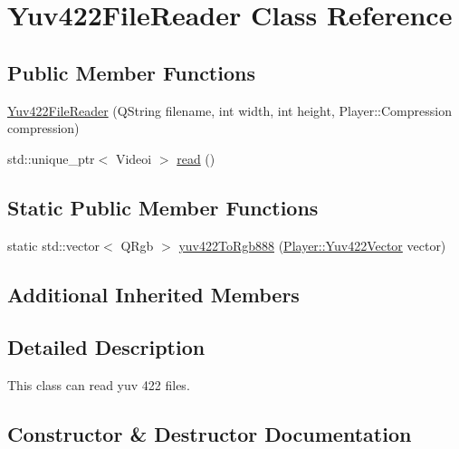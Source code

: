 \hypertarget{classPlayer_1_1Yuv422FileReader}{}\section{Yuv422\+File\+Reader Class Reference}
\label{classPlayer_1_1Yuv422FileReader}
\subsection*{Public Member Functions}
\begin{DoxyCompactItemize}
\item 
\hyperlink{classPlayer_1_1Yuv422FileReader_a877c00dcf796aec81c1cb888ccff26dc}{Yuv422\+File\+Reader} (Q\+String filename, int width, int height, Player\+::\+Compression compression)
\item 
std\+::unique\+\_\+ptr$<$ Videoi $>$ \hyperlink{classPlayer_1_1Yuv422FileReader_a15c2e3c024093026de6ca23b53ba3a22}{read} ()
\end{DoxyCompactItemize}
\subsection*{Static Public Member Functions}
\begin{DoxyCompactItemize}
\item 
static std\+::vector$<$ Q\+Rgb $>$ \hyperlink{classPlayer_1_1Yuv422FileReader_ab279b48f32ef93e4b70fdf23a3c3e7e3}{yuv422\+To\+Rgb888} (\hyperlink{classPlayer_1_1Yuv422Vector}{Player\+::\+Yuv422\+Vector} vector)
\end{DoxyCompactItemize}
\subsection*{Additional Inherited Members}


\subsection{Detailed Description}
This class can read yuv 422 files. 

\subsection{Constructor \& Destructor Documentation}
\hypertarget{classPlayer_1_1Yuv422FileReader_a877c00dcf796aec81c1cb888ccff26dc}{}
